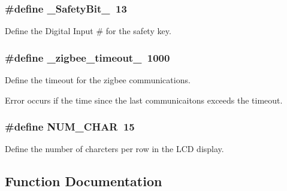 \subsubsection[{\texorpdfstring{\+\_\+\+Safety\+Bit\+\_\+}{\_SafetyBit\_}}]{\setlength{\rightskip}{0pt plus 5cm}\#define \+\_\+\+Safety\+Bit\+\_\+~13}\hypertarget{masterPanel_8ino_a3091b65befbc4ba8ae2a2cd5a0ed50a9}{}\label{masterPanel_8ino_a3091b65befbc4ba8ae2a2cd5a0ed50a9}


Define the Digital Input \# for the safety key. 

\subsubsection[{\texorpdfstring{\+\_\+zigbee\+\_\+timeout\+\_\+}{\_zigbee\_timeout\_}}]{\setlength{\rightskip}{0pt plus 5cm}\#define \+\_\+zigbee\+\_\+timeout\+\_\+~1000}\hypertarget{masterPanel_8ino_a6b982ea9a4c912acbfd98bbd5072e258}{}\label{masterPanel_8ino_a6b982ea9a4c912acbfd98bbd5072e258}


Define the timeout for the zigbee communications. 

Error occurs if the time since the last communicaitons exceeds the timeout. 
\subsubsection[{\texorpdfstring{N\+U\+M\+\_\+\+C\+H\+AR}{NUM\_CHAR}}]{\setlength{\rightskip}{0pt plus 5cm}\#define N\+U\+M\+\_\+\+C\+H\+AR~15}\hypertarget{masterPanel_8ino_af22601eb964b24e375a5dad9c85a3a46}{}\label{masterPanel_8ino_af22601eb964b24e375a5dad9c85a3a46}


Define the number of charcters per row in the L\+CD display. 



\subsection{Function Documentation}
